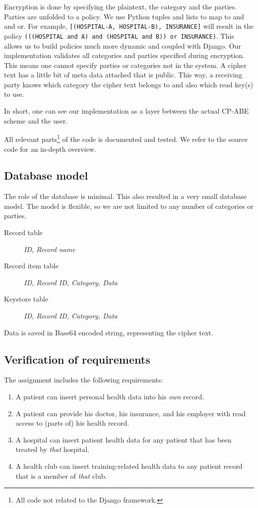 \documentclass[a4paper]{article}
\begin{document}
		Encryption is done by specifying the plaintext, the category and the parties. Parties are unfolded to a policy. We use Python tuples and lists to map to and and or. For example, \texttt{[(HOSPITAL-A, HOSPITAL-B), INSURANCE]} will result in the policy \texttt{(((HOSPITAL and A) and (HOSPITAL and B)) or INSURANCE)}. This allows us to build policies much more dynamic and coupled with Django. Our implementation validates all categories and parties specified during encryption. This means one cannot specify parties or categories not in the system. A cipher text has a little bit of meta data attached that is public. This way, a receiving party knows which category the cipher text belongs to and also which read key(s) to use.
		
		
		In short, one can see our implementation as a layer between the actual CP-ABE scheme and the user.
				
		All relevant parts\footnote{All code not related to the Django framework.} of the code is documented and tested. We refer to the source code for an in-depth overview.
	
	\subsection{Database model}
		The role of the database is minimal. This also resulted in a very small database model. The model is flexible, so we are not limited to any number of categories or parties.
		
		\begin{description}
			\item[Record table]
			\textit{ID, Record name} 
			\item[Record item table]
			\textit{ID, Record ID, Category, Data} 			
			\item[Keystore table]
			\textit{ID, Record ID, Category, Data}
		\end{description}
	
		Data is saved in Base64 encoded string, representing the cipher text.
	
	\subsection{Verification of requirements}
		The assignment includes the following requirements:
		
		\begin{enumerate}
			\item{A patient can insert personal health data into his \textit{own} record.}
			\item{A patient can provide his doctor, his insurance, and his employer with read access to (parts of) his health record.}
			\item{A hospital can insert patient health data for any patient that has been treated by \textit{that} hospital.}
			\item{A health club can insert training-related health data to any patient record that is a member of \textit{that} club.}
		\end{enumerate}
		
\end{document}
